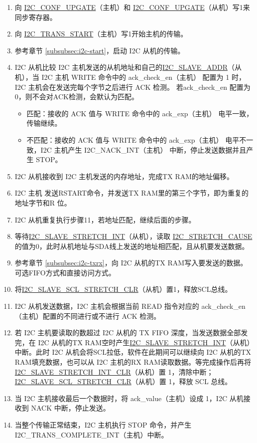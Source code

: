 \documentclass[main\_\_CN.tex]{subfiles}
\begin{document}
\begin{enumerate}
\item 向 \hyperref[fielddesc:I2CCONFUPGATE]{I2C\_CONF\_UPGATE}（主机）和 \hyperref[fielddesc:I2CCONFUPGATE]{I2C\_CONF\_UPGATE}（从机）写1来同步寄存器。
\item 向 \hyperref[fielddesc:I2CTRANSSTART]{I2C\_TRANS\_START}（主机）写1开始主机的传输。
\item 参考章节 \ref{subsubsec:i2c-start}，启动 I2C 从机的传输。
   

\item I2C 从机比较 I2C 主机发送的从机地址和自己的\hyperref[fielddesc:I2CSLAVEADDR]{I2C\_SLAVE\_ADDR}（从机），当 I2C 主机 WRITE 命令中的 ack\_check\_en（主机） 配置为 1 时，I2C 主机会在发送完每个字节之后进行 ACK 检测。 若ack\_check\_en 配置为 0，则不会对ACK检测，会默认为匹配。
\begin{itemize}
\item 匹配：接收的 ACK 值与 WRITE 命令中的 ack\_exp（主机） 电平一致，传输继续。
\item 不匹配：接收的 ACK 值与 WRITE 命令中的 ack\_exp（主机） 电平不一致，I2C 主机产生 I2C\_NACK\_INT（主机） 中断，停止发送数据并且产生 STOP。
\end{itemize}
\item I2C 从机接收到 I2C 主机发送的内存地址，完成TX RAM的地址偏移。
\item I2C 主机 发送RSTART命令，并发送TX RAM里的第三个字节，即为重复的地址字节和R 位。
\item I2C 从机重复执行步骤11，若地址匹配，继续后面的步骤。

\item 等待\hyperref[int:i2c-slave-stretch]{I2C\_SLAVE\_STRETCH\_INT}（从机），读取 \hyperref[fielddesc:I2CSTRETCHCAUSE]{I2C\_STRETCH\_CAUSE} 的值为0，此时从机地址与SDA线上发送的地址相匹配，且从机要发送数据。

\item 参考章节 \ref{subsubsec:i2c-txrx}，向 I2C 从机的TX RAM写入要发送的数据。可选FIFO方式和直接访问方式。
\item 将\hyperref[fielddesc:I2CSLAVESCLSTRETCHCLR]{I2C\_SLAVE\_SCL\_STRETCH\_CLR}（从机）置1，释放SCL总线。


\item I2C 从机发送数据，I2C 主机会根据当前 READ 指令对应的 ack\_check\_en（主机）配置的不同进行或不进行 ACK 检测。
\item 若 I2C 主机要读取的数超过 I2C 从机的 TX FIFO 深度，当发送数据全部发完，在 I2C 从机的TX RAM空时产生\hyperref[int:i2c-slave-stretch]{I2C\_SLAVE\_STRETCH\_INT}（从机）中断。此时 I2C 从机会将SCL拉低，软件在此期间可以继续向 I2C 从机的TX RAM填充数据，也可以从 I2C 主机的RX RAM读取数据。等完成操作后再将\hyperref[fielddesc:I2CSLAVESTRETCHINTCLR]{I2C\_SLAVE\_STRETCH\_INT\_CLR}（从机）置 1，清除中断；\hyperref[fielddesc:I2CSLAVESCLSTRETCHCLR]{I2C\_SLAVE\_SCL\_STRETCH\_CLR}（从机）置 1，释放 SCL 总线。

\item 当 I2C 主机接收最后一个数据时，将 ack\_value（主机）设成 1，I2C 从机接收到 NACK 中断，停止发送。

\item 当整个传输正常结束，I2C 主机执行 STOP 命令，并产生 I2C\_TRANS\_COMPLETE\_INT（主机）中断。
\end{enumerate}
\end{document}
